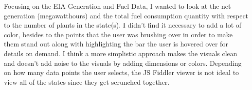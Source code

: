 \documentclass{neu_handout}
\begin{document}
Focusing on the EIA Generation and Fuel Data, I wanted to look at the net generation (megawatthours) and the total fuel consumption quantity with respect to the number of plants in the state(s). I didn't find it necessary to add a lot of color, besides to the points that the user was brushing over in order to make them stand out along with highlighting the bar the user is hovered over for details on demand. I think a more simplistic approach makes the visuals clean and doesn't add noise to the visuals by adding dimensions or colors. Depending on how many data points the user selects, the JS Fiddler viewer is not ideal to view all of the states since they get scrunched together.
\end{document}
